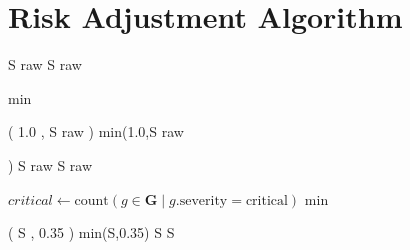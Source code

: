 \documentclass[12pt,a4paper]{report}
\begin{document}
\section{Risk Adjustment Algorithm}
\begin{algorithm}[H]
\caption{Risk-Adjusted Score with Veto Logic}
\label{alg:risk_adjust}
\begin{algorithmic}[1]
\RETURN 
S
raw
S 
raw

\RETURN 
min

(
1.0
,
S
raw
)
min(1.0,S 
raw

 )
\ELSE
\RETURN 
S
raw
S 
raw

 
\ENDIF
\ENDFUNCTION

\STATE $critical \gets \text{count}(g \in \mathbf{G} \mid g.\text{severity} = \text{critical})$
\RETURN 
min

(
S
,
0.35
)
min(S,0.35)
\ELSE
\RETURN 
S
S
\ENDIF
\ENDFUNCTION
\end{algorithmic}
\end{algorithm}
\end{document}
